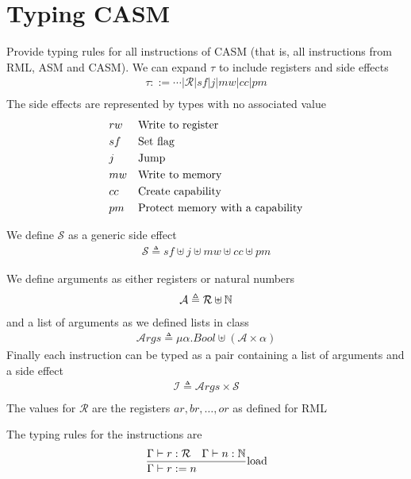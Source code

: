 \documentclass{article}
\begin{document}
\section{Typing CASM}
Provide typing rules for all instructions of CASM (that is, all instructions from RML, ASM and CASM).
\hline
We can expand $\tau$ to include registers and side effects
\begin{gather*}
    \tau ::= \cdots | \mathcal R | sf | j | mw | cc | pm \\
\end{gather*}
The side effects are represented by types with no associated value
\begin{align*}
    & rw && \text{Write to register} \\
    & sf && \text{Set flag} \\
    & j  && \text{Jump} \\
    & mw && \text{Write to memory} \\
    & cc && \text{Create capability} \\
    & pm && \text{Protect memory with a capability} \\
\end{align*}

We define $\mathcal S$ as a generic side effect
\begin{align*}
    \mathcal S \triangleq sf \uplus j \uplus mw \uplus cc \uplus pm
\end{align*}

We define arguments as either registers or natural numbers
\begin{align*}
    \mathcal A \triangleq \mathcal R \uplus \mathbb N
\end{align*}
and a list of arguments as we defined lists in class
\begin{align*}
    \mathcal Args \triangleq \mu \alpha. Bool \uplus (\mathcal A \times \alpha)
\end{align*}
Finally each instruction can be typed as a pair containing a list of arguments and a side effect
\begin{gather*}
    \mathcal{I} \triangleq \mathcal Args \times \mathcal S \\
\end{gather*}
The values for $\mathcal R$ are the registers $ar,br,\dots,or$ as defined for RML

The typing rules for the instructions are
\begin{gather*}
    \begin{array}{lcr}
        \st[load]{\Gamma\vdash r:=n}{\Gamma\vdash r: \mathcal R \quad \Gamma\vdash n:\N}
    \end{array}
\end{gather*}
\end{document}
